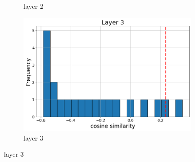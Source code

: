 \documentclass[11pt]{article}
\begin{document}
\begin{figure}[t]
\begin{subfigure}[t]{0.24\textwidth}
    \caption{layer 2}
  \end{subfigure}\hfill
  \begin{subfigure}[t]{0.24\textwidth}
    \centering
    \includegraphics[width=1.4\columnwidth]{figures/obs2_appendix/obs2_layer3.png}
    \caption{layer 3}
  \end{subfigure}\hfill
    \vspace{2mm}


\end{figure}
\end{document}
